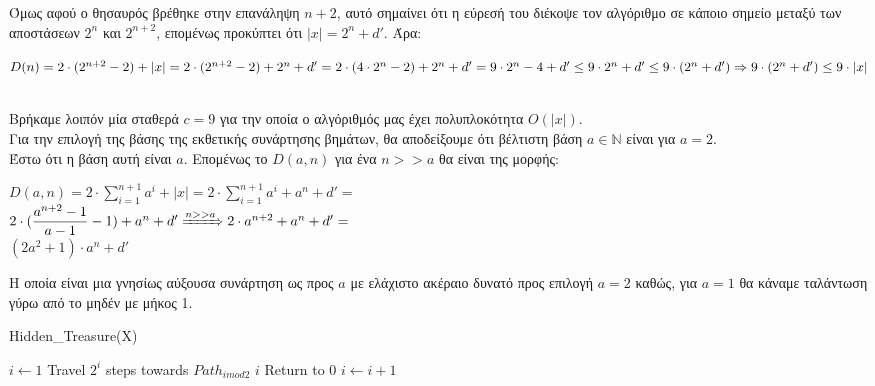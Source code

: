 \documentclass{article} \usepackage[greek,english]{babel}
\begin{document}
Όμως αφού ο θησαυρός βρέθηκε στην επανάληψη $n+2$, αυτό σημαίνει ότι η εύρεσή του διέκοψε τον αλγόριθμο
σε κάποιο σημείο μεταξύ των αποστάσεων $2^n$ και $2^{n+2}$, επομένως προκύπτει ότι $|x| = 2^n + d'$. Άρα: \\

\begin{center}
    $D(n) = 
    2 \cdot (2^{n+2}-2)+|x| = \\
    2 \cdot (2^{n+2}-2)+2^n+d' = \\
    2 \cdot (4 \cdot 2^n -2) + 2^n +d' = \\
    9 \cdot 2^n -4 + d' \le 9 \cdot 2^n + d' \le 9 \cdot (2^n + d')  \Rightarrow \\
    9 \cdot (2^n + d')\le 9 \cdot |x|
    $
\end{center} \\

Βρήκαμε λοιπόν μία σταθερά $c=9$ για την οποία ο αλγόριθμός μας έχει πολυπλοκότητα $Ο(|x|)$.\\
Για την επιλογή της βάσης της εκθετικής συνάρτησης βημάτων, θα αποδείξουμε ότι βέλτιστη βάση 
$a \in \mathbb{N}$ είναι
για $a=2$. \\ Έστω ότι η βάση αυτή είναι $a$. Επομένως το $D(a,n)$ για ένα $n >> a$
θα είναι της μορφής:\\
\begin{center}
    $D(a,n) = 2\cdot \sum_{i=1}^{n+1}{a^i} + |x| = 2\cdot \sum_{i=1}^{n+1}{a^i} + a^n + d' = $\\
    $2 \cdot (\dfrac{a^{n+2}-1}{a-1}-1) + a^n + d' \xRightarrow{n>>a} 2 \cdot a^{n+2} + a^n + d' =$ \\
    $(2a^2 + 1)\cdot a^n + d'$ \\
\end{center}

Η οποία είναι μια γνησίως αύξουσα συνάρτηση ως προς $a$ με ελάχιστο ακέραιο δυνατό προς επιλογή $a=2$ καθώς,
για $a=1$ θα κάναμε ταλάντωση γύρω από το μηδέν με μήκος 1.
    \begin{algorithm}
        \caption{Hidden\_Treasure(X)}
        \begin{algorithmic}[1]
            \State $i \leftarrow 1$
            \State Travel $2^i$ steps towards $Path_{imod2}$
            \Return $i$ 
            \Else
                \State Return to $0$
                \State $i \leftarrow i + 1$
            \EndIf
            \EndWhile

        \end{algorithmic}
    \end{algorithm}
\end{document}
